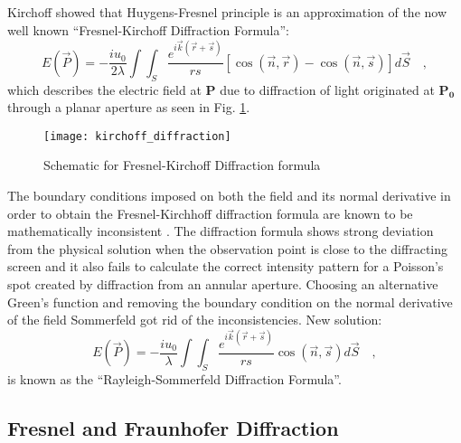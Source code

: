 Kirchoff \cite{kirchoff1883} showed that Huygens-Fresnel principle is an approximation of the now well known ``Fresnel-Kirchoff Diffraction Formula'':
\begin{equation}
\label{eq:fresnel_kirchoff}
E(\vec{P}) = -\frac{iu_0}{2\lambda}\int \int _S \frac{e^{i\vec{k}(\vec{r}+\vec{s})}}{rs}\left[\cos (\vec{n},\vec{r}) - \cos (\vec{n},\vec{s})\right]d\vec{S} \quad ,
\end{equation}
which describes the electric field at \textbf{P} due to diffraction of light originated at $\mathbf{P_0}$ through a planar aperture as seen in Fig. \ref{fig:kirchoff_diffraction}.
\begin{figure}[t!]
  \centering
  \texttt{[image: kirchoff\_diffraction]}
  \caption{Schematic for Fresnel-Kirchoff Diffraction formula}
  \label{fig:kirchoff_diffraction}
\end{figure}
The boundary conditions imposed on both the field and its normal derivative in order to obtain the Fresnel-Kirchhoff diffraction formula are known to be mathematically inconsistent \cite{Lucke_2006, Heurtley:73, Sommerfeld:1954:O}.  The diffraction formula shows strong deviation from the physical solution when the observation point is close to the diffracting screen and it also fails to calculate the correct intensity pattern for a Poisson's spot created by diffraction from an annular aperture. Choosing an alternative Green's function and removing the boundary condition on the normal derivative of the field Sommerfeld got rid of the inconsistencies. New solution:
\begin{equation}
\label{eq:rayleigh_sommerfeld}
E(\vec{P}) = -\frac{iu_0}{\lambda}\int \int _S \frac{e^{i\vec{k}(\vec{r}+\vec{s})}}{rs} \cos (\vec{n},\vec{s}) d\vec{S} \quad ,
\end{equation}
is known as the ``Rayleigh-Sommerfeld Diffraction Formula''.

\subsection{Fresnel and Fraunhofer Diffraction}
%

